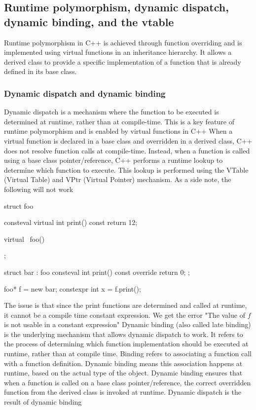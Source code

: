 \documentclass{report}
\begin{document}
    \bigbreak \noindent 
    \subsection{Runtime polymorphism, dynamic dispatch, dynamic binding,  and the vtable}
    \bigbreak \noindent 
    Runtime polymorphism in C++ is achieved through function overriding and is implemented using virtual functions in an inheritance hierarchy. It allows a derived class to provide a specific implementation of a function that is already defined in its base class.
    \bigbreak \noindent 
    \subsubsection{Dynamic dispatch and dynamic binding}
    \bigbreak \noindent 
    Dynamic dispatch is a mechanism where the function to be executed is determined at runtime, rather than at compile-time. This is a key feature of runtime polymorphism and is enabled by virtual functions in C++
    \bigbreak \noindent 
    When a virtual function is declared in a base class and overridden in a derived class, C++ does not resolve function calls at compile-time.
    \bigbreak \noindent 
    Instead, when a function is called using a base class pointer/reference, C++ performs a runtime lookup to determine which function to execute.
    \bigbreak \noindent 
    This lookup is performed using the VTable (Virtual Table) and VPtr (Virtual Pointer) mechanism.
    \bigbreak \noindent 
    As a side note, the following will not work
    \bigbreak \noindent 
    \begin{cppcode}
        struct foo {
            consteval virtual int print() const {
                return 12;
            }

            virtual ~foo() {}
        };

        struct bar : foo {
            consteval int print() const override {
                return 0;
            }
        };

        foo* f = new bar{};
        constexpr int x = f.print();
    \end{cppcode}
    \bigbreak \noindent 
    The issue is that since the print functions are determined and called at runtime, it cannot be a compile time constant expression. We get the error "The value of $f$ is not usable in a constant expression"
    \bigbreak \noindent 
    Dynamic binding (also called late binding) is the underlying mechanism that allows dynamic dispatch to work. It refers to the process of determining which function implementation should be executed at runtime, rather than at compile time.
    \bigbreak \noindent 
    Binding refers to associating a function call with a function definition. Dynamic binding means this association happens at runtime, based on the actual type of the object.
    \bigbreak \noindent 
    Dynamic binding ensures that when a function is called on a base class pointer/reference, the correct overridden function from the derived class is invoked at runtime. Dynamic dispatch is the result of dynamic binding
\end{document}
